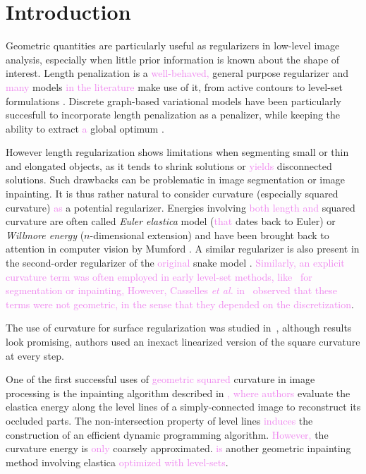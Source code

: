 \documentclass[runningheads]{llncs}
\newcommand{\todo}[1]{{\textcolor{blue}{#1}}}
\newcommand{\HT}[1]{{\textcolor{violet}{#1}}}
\begin{document}
\section{Introduction} %


Geometric quantities are particularly useful as regularizers in
low-level image analysis, especially when little prior information is
known about the shape of interest. Length penalization is a \HT{well-behaved,} general
purpose regularizer and \HT{many} models \HT{in the literature} make use
of it, from active contours \cite{casseles97geodesic} to level-set
formulations \cite{malladi1995image,malladi1995shape}. Discrete
graph-based variational models have been particularly succesfull to
incorporate length penalization as a penalizer, while keeping the
ability to extract \HT{a} global optimum
\cite{boykov01graphcut,appleton05geodesic}.

However length regularization shows limitations when segmenting
small or thin and elongated objects, as it tends to shrink solutions
or \HT{yields} disconnected solutions. Such drawbacks can be problematic in
image segmentation or image inpainting. It is thus rather natural to
consider curvature (especially squared curvature) \HT{as} a potential
regularizer. Energies involving \HT{both length and} squared curvature are often called
{\em Euler elastica} model (\HT{that} dates back to Euler) or {\em Willmore energy}
($n$-dimensional extension) and have been brought back to attention in
computer vision by Mumford \cite{mumford1994elastica}. A similar
regularizer is also present in the second-order regularizer
of the \HT{original} snake model \cite{kass1988snakes}. \HT{Similarly,
an explicit curvature term was often employed in early level-set methods,
like~\cite{malladi1995image,malladi1995shape,ballester01filljoint} for segmentation or inpainting,}
\HT{However, Casselles {\em et al.} in~\cite{casseles97geodesic} observed that these
terms were not geometric, in the sense that they depended on the discretization}.

The use of curvature for surface regularization was studied in~\cite{bobenko2005discrete},
although results look promising, authors used an inexact linearized version of the
square curvature at every step.

One of the first successful uses of \HT{geometric squared} curvature in image processing is the inpainting algorithm
described in \cite{masnou98inpainting}\HT{, where authors} evaluate the elastica energy along the level lines of a
simply-connected image to reconstruct its occluded parts. The non-intersection property of level lines \HT{induces} the
construction of an efficient dynamic programming algorithm. \HT{However, } the curvature energy is \HT{only} coarsely
approximated.  \cite{chan02elasticainpainting} \HT{is} another geometric inpainting method involving elastica
\HT{optimized with level-sets}.
\end{document}
